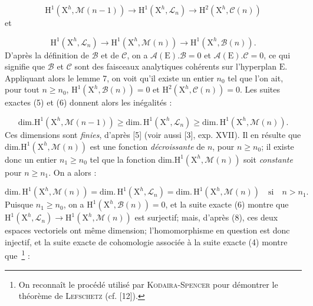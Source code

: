 \begin{equation}\tag{5}
\mathrm{H}^1(\mathrm{X}^h, \mathcal{M}(n-1)) \to \mathrm{H}^1(\mathrm{X}^h, \mathcal{L}_n) \to \mathrm{H}^2(\mathrm{X}^h, \mathcal{C}(n))
\end{equation}
et

\begin{equation}\tag{6}
\mathrm{H}^1(\mathrm{X}^h, \mathcal{L}_n) \to \mathrm{H}^1(\mathrm{X}^h, \mathcal{M}(n)) \to \mathrm{H}^1(\mathrm{X}^h, \mathcal{B}(n)).
\end{equation}
D'après la définition de $\mathcal{B}$ et de $\mathcal{C}$, on a $\mathcal{A}(\mathrm{E}).\mathcal{B} = 0$ et $\mathcal{A}(\mathrm{E}).\mathcal{C} = 0$, ce qui signifie que $\mathcal{B}$ et $\mathcal{C}$ sont des faisceaux analytiques cohérents sur l'hyperplan $\mathrm{E}$. Appliquant alors le lemme 7, on voit qu'il existe un entier $n_0$ tel que l'on ait, pour tout $n \geqslant n_0$, $\mathrm{H}^1(\mathrm{X}^h, \mathcal{B}(n)) = 0$ et $\mathrm{H}^2(\mathrm{X}^h, \mathcal{C}(n)) = 0$. Les suites exactes (5) et (6) donnent alors les inégalités :

\begin{equation}\tag{7}
\mathrm{dim.}\mathrm{H}^1(\mathrm{X}^h, \mathcal{M}(n-1)) \geqslant \mathrm{dim.}\,\mathrm{H}^1(\mathrm{X}^h, \mathcal{L}_n) \geqslant \mathrm{dim.}\,\mathrm{H}^1(\mathrm{X}^h, \mathcal{M}(n)).
\end{equation}
Ces dimensions sont \textit{finies}, d'après [5] (voir aussi [3], exp. XVII). Il en résulte que dim.$\mathrm{H}^1(\mathrm{X}^h, \mathcal{M}(n))$ est une fonction \textit{décroissante} de $n$, pour $n \geqslant n_0$; il existe donc un entier $n_1 \geqslant n_0$ tel que la fonction dim.$\mathrm{H}^1(\mathrm{X}^h, \mathcal{M}(n))$ soit \textit{constante} pour $n \geqslant n_1$. On a alors :

\begin{equation}\tag{8}
\mathrm{dim.}\,\mathrm{H}^1(\mathrm{X}^h, \mathcal{M}(n)) = \mathrm{dim.}\,\mathrm{H}^1(\mathrm{X}^h, \mathcal{L}_n) = \mathrm{dim.}\,\mathrm{H}^1(\mathrm{X}^h, \mathcal{M}(n)) \quad \mathrm{si} \quad n > n_1.
\end{equation}
Puisque $n_1 \geqslant n_0$, on a $\mathrm{H}^1(\mathrm{X}^h, \mathcal{B}(n)) = 0$, et la suite exacte (6) montre que $\mathrm{H}^1(\mathrm{X}^h, \mathcal{L}_n) \to \mathrm{H}^1(\mathrm{X}^h, \mathcal{M}(n))$ est surjectif; mais, d'après (8), ces deux espaces vectoriels ont même dimension; l'homomorphisme en question est donc injectif, et la suite exacte de cohomologie associée à la suite exacte (4) montre que\ \footnote{On reconnaît le procédé utilisé par \textsc{Kodaira-Spencer} pour démontrer le théorème de \textsc{Lefschetz} (cf. [12]).} :

